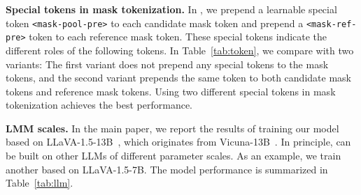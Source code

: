 \noindent\textbf{Special tokens in mask tokenization.} In \ourmodel, we prepend a learnable special token \texttt{\textless mask-pool-pre\textgreater} to each candidate mask token and prepend a \texttt{\textless mask-ref-pre\textgreater} token to each reference mask token. These special tokens indicate the different roles of the following tokens. In Table~\ref{tab:token}, we compare \ourmodel with two variants: The first variant does not prepend any special tokens to the mask tokens, and the second variant prepends the same token to both candidate mask tokens and reference mask tokens. Using two different special tokens in mask tokenization achieves the best performance.

\begin{table}[t!]
    \centering
    \caption{\textbf{Comparison of \ourmodel with different special tokens prepended to mask tokens.} Prepending \texttt{\textless mask-pool-pre\textgreater} to candidate mask tokens and \texttt{\textless mask-ref-pre\textgreater} to reference mask tokens leads to the best result. All models are trained on the same 0.5M samples from \ourlargedata and evaluated on \ourgooddata.}
    \label{tab:token}
\end{table}

\noindent\textbf{LMM scales.} In the main paper, we report the results of training our model \ourmodel based on LLaVA-1.5-13B~\cite{liu2024improved}, which originates from Vicuna-13B~\cite{vicuna2023}. In principle, \ourmodel can be built on other LLMs of different parameter scales. As an example, we train another \ourmodel based on LLaVA-1.5-7B. The model performance is summarized in Table~\ref{tab:llm}.

